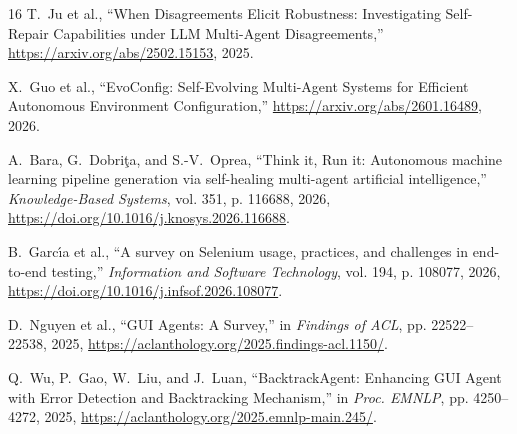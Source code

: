 \documentclass[conference]{IEEEtran}
\begin{document}
\begin{thebibliography}{16}
T.~Ju et al., ``When Disagreements Elicit Robustness: Investigating Self-Repair Capabilities under LLM Multi-Agent Disagreements,'' \url{https://arxiv.org/abs/2502.15153}, 2025.

X.~Guo et al., ``EvoConfig: Self-Evolving Multi-Agent Systems for Efficient Autonomous Environment Configuration,'' \url{https://arxiv.org/abs/2601.16489}, 2026.

A.~Bara, G.~Dobri\c{t}a, and S.-V.~Oprea, ``Think it, Run it: Autonomous machine learning pipeline generation via self-healing multi-agent artificial intelligence,'' \emph{Knowledge-Based Systems}, vol. 351, p. 116688, 2026, \url{https://doi.org/10.1016/j.knosys.2026.116688}.

B.~Garc\'{\i}a et al., ``A survey on Selenium usage, practices, and challenges in end-to-end testing,'' \emph{Information and Software Technology}, vol. 194, p. 108077, 2026, \url{https://doi.org/10.1016/j.infsof.2026.108077}.

D.~Nguyen et al., ``GUI Agents: A Survey,'' in \emph{Findings of ACL}, pp. 22522--22538, 2025, \url{https://aclanthology.org/2025.findings-acl.1150/}.

Q.~Wu, P.~Gao, W.~Liu, and J.~Luan, ``BacktrackAgent: Enhancing GUI Agent with Error Detection and Backtracking Mechanism,'' in \emph{Proc. EMNLP}, pp. 4250--4272, 2025, \url{https://aclanthology.org/2025.emnlp-main.245/}.

\end{thebibliography}
\end{document}
